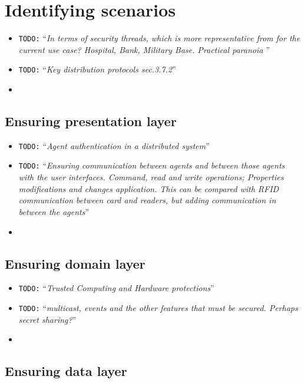 \documentclass[10pt,a4paper,twoside]{llncs}
\newcommand{\todo}[1]{\texttt{\color{red}TODO:} ``\emph{#1}''}
\begin{document}
%
\section{Identifying scenarios \label{sec:scenarios}}

\begin{itemize}
 \item \todo{In terms of security threads, which is more representative from \cite{SecEngRossAnderson} for the current use case? Hospital, Bank, Military Base. Practical paranoia \cite{PractCryptoSchneier}}
 \item \todo{Key distribution protocols \cite{SecEngRossAnderson} sec.3.7.2}
 \item 
\end{itemize}

%
\subsection{Ensuring presentation layer}

\begin{itemize}
 \item \todo{Agent authentication in a distributed system}
 \item \todo{Ensuring communication between agents and between those agents with the user interfaces. \emph{Command}, \emph{read} and \emph{write} operations; \emph{Properties} modifications and changes application. This can be compared with \emph{RFID} communication between card and readers, but adding communication in between the agents}
 \item 
\end{itemize}

%
\subsection{Ensuring domain layer}

\begin{itemize}
 \item \todo{Trusted Computing and Hardware protections}
 \item \todo{multicast, events and the other features that must be secured. Perhaps secret sharing?}
 \item 
\end{itemize}

%
\subsection{Ensuring data layer}
\end{document}
